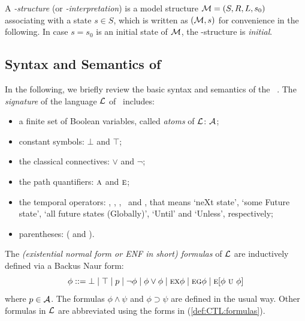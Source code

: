 \documentclass{article}
\begin{document}
A {\em \MPK-structure} (or {\em \MPK-interpretation}) is a model structure
${\cal M}=(S, R, L, s_0)$ associating
with a state $s\in S$, which is written as $({\cal M},s)$ for convenience in the following.
In case $s=s_0$ is an initial state of $\cal M$, the \MPK-structure is {\em initial}.



\subsection{Syntax and Semantics of \CTL}
In the following, we briefly review the basic syntax and semantics
of the \CTL~\cite{DBLP:journals/toplas/ClarkeES86}.
The {\em signature} of the language $\cal L$ of \CTL\ includes:
\begin{itemize}
  \item a finite set of Boolean variables, called {\em atoms} of $\cal L$: $\cal A$;
  \item constant symbols: $\bot$ and $\top$;
  \item the classical connectives: $\lor$ and $\neg$;
  \item the path quantifiers: $\textsc{a}$ and $\textsc{e}$;
  \item the temporal operators: \NEXT, \FUTURE, \GLOBAL, \UNTIL\ and \UNLESS, that
  means `neXt state', `some Future state', `all future states (Globally)', `Until' and `Unless', respectively;
  \item parentheses: ( and ).
\end{itemize}

The {\em (existential normal form or ENF in short) formulas} of
$\cal L$ are inductively defined via a Backus Naur form:
\begin{equation}\label{def:CTL:formulas}
  \phi ::=  \bot \mid \top \mid p \mid\neg\phi \mid \phi\lor\phi \mid
    \EXIST \NEXT \phi \mid
    \EXIST \GLOBAL \phi \mid
    \EXIST [\phi\ \UNTIL\ \phi]%
\end{equation}
where $p\in\cal A$. The formulas $\phi\land\psi$ and $\phi\supset \psi$
are defined in the usual way.
Other formulas in $\cal L$ are abbreviated
using the forms in (\ref{def:CTL:formulas}).
\end{document}
